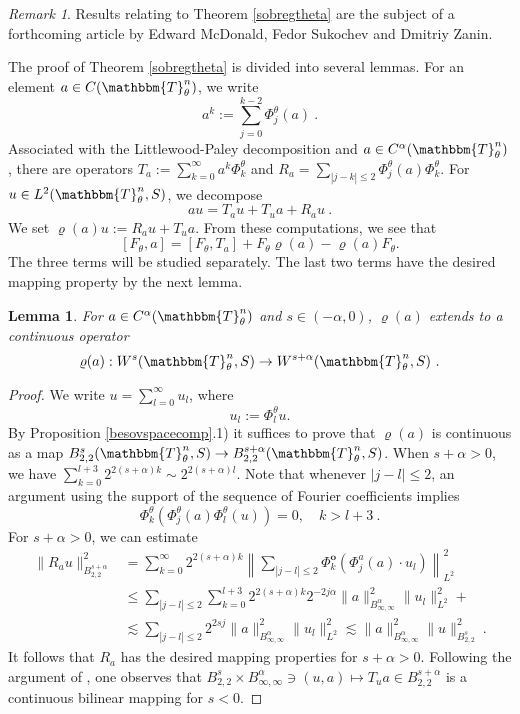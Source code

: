 \documentclass[10pt]{amsart}
\newtheorem{lem}[thm]{Lemma}
\theoremstyle{remark}
\newtheorem{remark}[thm]{Remark}
\theoremstyle{definition}
\begin{document}
\begin{remark}
Results relating to Theorem \ref{sobregtheta} are the subject of a forthcoming article by Edward McDonald, Fedor Sukochev and Dmitriy Zanin. 
\end{remark}

The proof of Theorem \ref{sobregtheta} is divided into several lemmas. For an element $a\in C({\mathbbm{T}}^n_\theta)$, we write 
\begin{equation}
\label{aupper}
a^k:=\sum_{j=0}^{k-2} \Phi^\theta_j(a)\ .
\end{equation} 
Associated with the Littlewood-Paley decomposition and $a\in C^\alpha({\mathbbm{T}}^n_\theta)$, there are operators $T_a:=\sum_{k=0}^\infty a^k\Phi_k^\theta$ and $R_a=\sum_{|j-k|\leq 2} \Phi_j^\theta(a)\Phi_k^\theta$. For $u\in L^2({\mathbbm{T}}^n_\theta,S)$, we decompose 
$$au=T_au+T_ua+R_au\ .$$ 
We set $\varrho(a)u:=R_au+T_ua$. From these computations, we see that
$$[F_\theta,a]=[F_\theta,T_a]+F_\theta \varrho(a)-\varrho(a)F_\theta.$$
The three terms will be studied separately. The last two terms have the desired mapping property by the next lemma.

\begin{lem}
For $a\in C^\alpha({\mathbbm{T}}^n_\theta)$ and $s\in (-\alpha,0)$, $\varrho(a)$ extends to a continuous operator
$$\varrho(a):W^s({\mathbbm{T}}^n_\theta,S)\to W^{s+\alpha}({\mathbbm{T}}^n_\theta,S)\ .$$
\end{lem}

\begin{proof}
We write $u=\sum_{l=0}^\infty u_l$, where 
\begin{equation}
\label{ulowerl}
u_l:=\Phi_{l}^{\theta}u. 
\end{equation}
By Proposition \ref{besovspacecomp}.1) it suffices to prove that $\varrho(a)$ is continuous as a map $B^s_{2,2}({\mathbbm{T}}^n_\theta,S)\to B^{s+\alpha}_{2,2}({\mathbbm{T}}^n_\theta,S)$. When $s+\alpha>0$, we have $\sum_{k=0}^{l+3}2^{2(s+\alpha)k}\sim 2^{2(s+\alpha)l}$. Note that whenever $|j-l|\leq 2$, an argument using the support of the sequence of Fourier coefficients implies
$$\Phi^\theta_k(\Phi_j^\theta(a)\Phi_l^\theta(u))=0, \quad k>l+3\ .$$
For $s+\alpha>0$, we can estimate
\begin{align*}
\|R_au\|_{B^{s+\alpha}_{2,2}}^2&=\sum_{k=0}^\infty 2^{2(s+\alpha)k}\left\|\sum_{|j-l|\leq 2} \Phi_{k}^{\pmb{o}}\left(\Phi_{j}^{a}(a)\cdot u_l\right)\right\|_{L^2}^2\\
&\leq \sum_{|j-l|\leq 2}\sum_{k=0}^{l+3} 2^{2(s+\alpha)k}2^{-2j\alpha}\|a\|_{B^\alpha_{\infty,\infty}}^2\|u_l\|_{L^2}^2+\\
&\lesssim \sum_{|j-l|\leq 2}2^{2sj}\|a\|_{B^\alpha_{\infty,\infty}}^2\|u_l\|_{L^2}^2\lesssim  \|a\|_{B^\alpha_{\infty,\infty}}^2\|u\|_{B^s_{2,2}}^2\ .
\end{align*}
It follows that $R_a$ has the desired mapping properties for $s+\alpha>0$. Following the argument of \cite[Theorem 5.1]{jon95}, one observes that $B^s_{2,2}\times B^\alpha_{\infty,\infty}\ni (u,a)\mapsto T_u a\in B^{s+\alpha}_{2,2}$ is a continuous bilinear mapping for $s<0$.
\end{proof}
\end{document}

